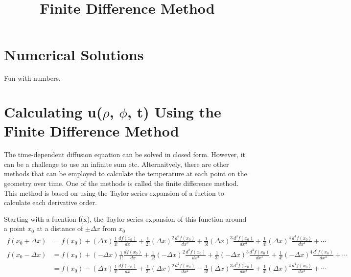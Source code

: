\documentclass[11pt]{article}
\title{Finite Difference Method}
\begin{document}
    
    \maketitle
    
    

    
    \hypertarget{numerical-solutions}{%
\section{Numerical Solutions}\label{numerical-solutions}}

    Fun with numbers.

    \hypertarget{calculating-urho-phi-t-using-the-finite-difference-method}{%
\section{\texorpdfstring{Calculating u(\(\rho\), \(\phi\), t) Using the
Finite Difference
Method}{Calculating u(\textbackslash rho, \textbackslash phi, t) Using the Finite Difference Method}}\label{calculating-urho-phi-t-using-the-finite-difference-method}}

    The time-dependent diffusion equation can be solved in closed form.
However, it can be a challenge to use an infinite sum etc.
Alternaitvely, there are other methods that can be employed to calculate
the temperature at each point on the geometry over time. One of the
methods is called the finite difference method. This method is based on
using the Taylor series expansion of a fuction to calculate each
derivative order.

Starting with a fucntion f(x), the Taylor series expansion of this
function around a point \(x_0\) at a distance of \(\pm \Delta x\) from
\(x_0\) \begin{equation}
\begin{split}
f(x_0 + \Delta x) &= f(x_0) + (\Delta x) \frac{1}{1!} \frac{df(x_0)}{dx} + \frac{1}{2!}(\Delta x)^2 \frac{d^2f(x_0)}{dx^2} + \frac{1}{3!} (\Delta x)^3 \frac{d^3f(x_0)}{dx^3} + \frac{1}{4!} (\Delta x)^4 \frac{d^4f(x_0)}{dx^4} + \cdots \\
f(x_0 - \Delta x) &= f(x_0) + (-\Delta x) \frac{1}{1!} \frac{df(x_0)}{dx} + \frac{1}{2!}(-\Delta x)^2 \frac{d^2f(x_0)}{dx^2} + \frac{1}{3!} (-\Delta x)^3 \frac{d^3f(x_0)}{dx^3} + \frac{1}{4!} (-\Delta x)^4 \frac{d^4f(x_0)}{dx^4} + \cdots \\
&= f(x_0) - (\Delta x) \frac{1}{1!} \frac{df(x_0)}{dx} + \frac{1}{2!}(\Delta x)^2 \frac{d^2f(x_0)}{dx^2} - \frac{1}{3!} (\Delta x)^3 \frac{d^3f(x_0)}{dx^3} + \frac{1}{4!} (\Delta x)^4 \frac{d^4f(x_0)}{dx^4} + \cdots 
\end{split}
\end{equation}
\end{document}
